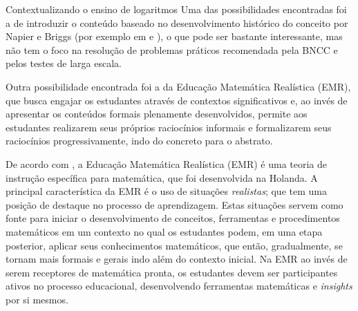 \begin{apresentacao}{Contextualizando o ensino de logaritmos}
Uma das possibilidades encontradas foi a de introduzir o conteúdo baseado no desenvolvimento histórico do conceito por Napier e Briggs (por exemplo em \cite{Pedrosa2018} e \cite{Panagiotou2011}), o que pode ser bastante interessante, mas não tem o foco na resolução de problemas práticos recomendada pela BNCC e pelos testes de larga escala.

Outra possibilidade encontrada foi a da Educação Matemática Realística (EMR), que busca engajar os estudantes através de contextos significativos e, ao invés de apresentar os conteúdos formais plenamente desenvolvidos, permite aos estudantes realizarem seus próprios raciocínios informais e formalizarem seus raciocínios progressivamente, indo do concreto para o abstrato.

De acordo com  \cite{HeuvelPanhuizen}, a Educação Matemática Realística (EMR) é uma teoria de instrução específica para matemática, que foi desenvolvida na Holanda. A principal característica da EMR é o uso de situações \textit{realistas}; que tem uma posição de destaque no processo de aprendizagem. Estas situações servem como fonte para iniciar o desenvolvimento de conceitos, ferramentas e procedimentos matemáticos em um contexto no qual os estudantes podem, em uma etapa posterior, aplicar seus conhecimentos matemáticos, que então, gradualmente, se tornam mais formais e gerais indo além do contexto inicial. Na EMR ao invés de serem receptores de matemática pronta, os estudantes devem ser participantes ativos no processo educacional, desenvolvendo ferramentas matemáticas e \textit{insights} por si mesmos.


\end{apresentacao}
